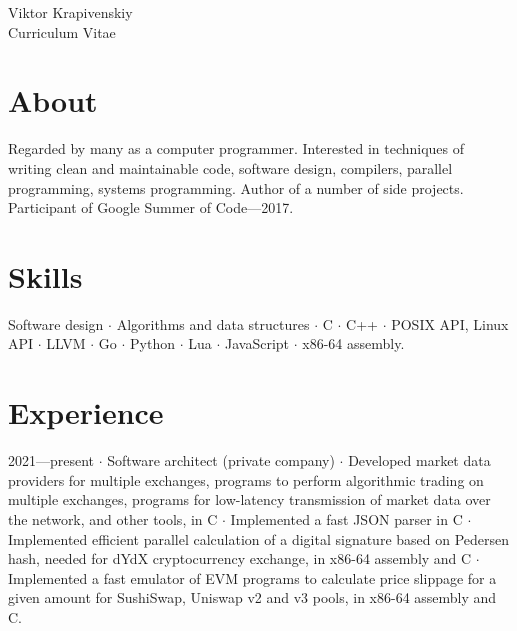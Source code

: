 \documentclass[10pt]{article}
\begin{document}
\parbox[top][0.12\textheight][c]{\linewidth}{
    \vspace{-0.04\textheight}
    \centering
    {\sffamily\Huge Viktor Krapivenskiy}\\\medskip
    {\Huge Curriculum Vitae}
}

\medskip

\section{About}

Regarded by many as a computer programmer.
Interested in
  techniques of writing clean and maintainable code,
  software design,
  compilers,
  parallel programming,
  systems programming.
Author of a number of side projects.
Participant of Google Summer of Code---2017.

\medskip

\section{Skills}

Software design $\cdot$
Algorithms and data structures $\cdot$
C $\cdot$
C++ $\cdot$
POSIX API, Linux API $\cdot$
LLVM $\cdot$
Go $\cdot$
Python $\cdot$
Lua $\cdot$
JavaScript $\cdot$
x86-64 assembly.

\medskip

%
%

\section{Experience}

2021---present $\cdot$ Software architect (private company) $\cdot$ Developed market data providers for multiple exchanges, programs to perform algorithmic trading on multiple exchanges, programs for low-latency transmission of market data over the network, and other tools, in C $\cdot$ Implemented a fast JSON parser in C $\cdot$ Implemented efficient parallel calculation of a digital signature based on Pedersen hash, needed for dYdX cryptocurrency exchange, in x86-64 assembly and C $\cdot$ Implemented a fast emulator of EVM programs to calculate price slippage for a given amount for SushiSwap, Uniswap v2 and v3 pools, in x86-64 assembly and C.
\end{document}
